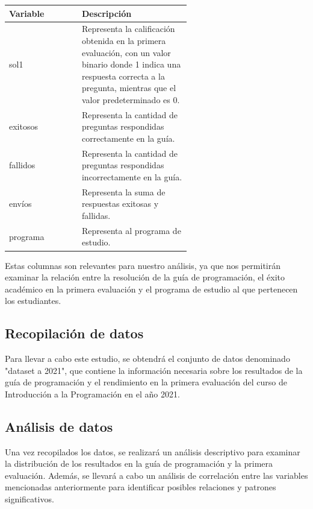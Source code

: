 \begin{center}
    \begin{tabular}{|l|p{0.6\linewidth}|}
      \hline
      \textbf{Variable} & \textbf{Descripción} \\
      \hline
      sol1 & Representa la calificación obtenida en la primera evaluación, con un valor binario donde 1 indica una respuesta correcta a la pregunta, mientras que el valor predeterminado es 0. \\
      \hline
      exitosos & Representa la cantidad de preguntas respondidas correctamente en la guía. \\
      \hline
      fallidos & Representa la cantidad de preguntas respondidas incorrectamente en la guía. \\
      \hline
      envíos & Representa la suma de respuestas exitosas y fallidas. \\
      \hline
      programa & Representa al programa de estudio. \\
      \hline
    \end{tabular}
  \end{center}

\vfill
Estas columnas son relevantes para nuestro análisis, ya que nos permitirán examinar la relación entre la resolución de la guía de programación,
el éxito académico en la primera evaluación y el programa de estudio al que pertenecen los estudiantes.

\vfill
\subsection*{Recopilación de datos}

Para llevar a cabo este estudio, se obtendrá el conjunto de datos denominado "dataset a 2021", que contiene la información necesaria sobre los
resultados de la guía de programación y el rendimiento en la primera evaluación del curso de Introducción a la Programación en el año 2021.

\vfill
\subsection*{Análisis de datos}

Una vez recopilados los datos, se realizará un análisis descriptivo para examinar la distribución de los resultados en la guía de programación y
la primera evaluación. Además, se llevará a cabo un análisis de correlación entre las variables mencionadas anteriormente para identificar posibles
relaciones y patrones significativos.
\vfill